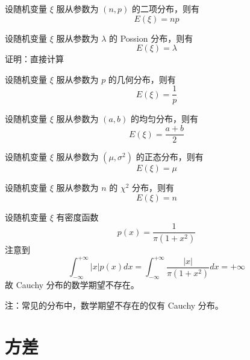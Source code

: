 \documentclass[12pt,a4paper]{amsart}
\begin{document}
\begin{proposition}[二项分布的数学期望]
    设随机变量 $\xi$ 服从参数为 $(n, p)$ 的二项分布，则有
    \begin{equation}
        E(\xi) = np
    \end{equation}
\end{proposition}

\begin{proposition}
    设随机变量 $\xi$ 服从参数为 $\lambda$ 的 Possion 分布，则有
    \begin{equation}
        E(\xi) = \lambda
    \end{equation}
    证明：直接计算
\end{proposition}

\begin{proposition}[几何分布的数学期望]
    设随机变量 $\xi$ 服从参数为 $p$ 的几何分布，则有
    \begin{equation}
        E(\xi) = \frac{1}{p}
    \end{equation}
\end{proposition}

\begin{proposition}[均匀分布的数学期望]
    设随机变量 $\xi$ 服从参数为 $(a, b)$ 的均匀分布，则有
    \begin{equation}
        E(\xi) = \frac{a + b}{2}
    \end{equation}
\end{proposition}

\begin{proposition}[正态分布的数学期望]
    设随机变量 $\xi$ 服从参数为 $(\mu, \sigma^2)$ 的正态分布，则有
    \begin{equation}
        E(\xi) = \mu
    \end{equation}
\end{proposition}

\begin{proposition}
    设随机变量 $\xi$ 服从参数为 $n$ 的 \( \chi^2 \) 分布，则有
    \begin{equation}
        E(\xi) = n
    \end{equation}
\end{proposition}

\begin{proposition}
    设随机变量 $\xi$ 有密度函数
    \begin{equation}
        p(x) = \frac{1}{\pi(1 + x^2)}
    \end{equation}
    注意到
    \begin{equation}
        \int_{-\infty}^{+\infty} |x| p(x) dx = \int_{-\infty}^{+\infty} \frac{|x|}{\pi(1 + x^2)} dx = +\infty
    \end{equation}
    故 Cauchy 分布的数学期望不存在。
\end{proposition}

注：常见的分布中，数学期望不存在的仅有 Cauchy 分布。

\section{方差}

\appendix



{\footnotesize}
\end{document}
